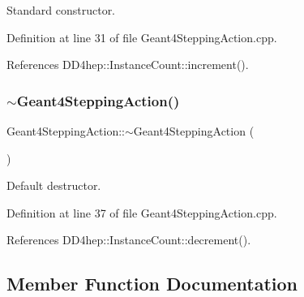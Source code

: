 Standard constructor. 



Definition at line 31 of file Geant4\+Stepping\+Action.\+cpp.



References D\+D4hep\+::\+Instance\+Count\+::increment().

\hypertarget{class_d_d4hep_1_1_simulation_1_1_geant4_stepping_action_a906c5651b3a3f39a44b4a3b5ab236375}{}\label{class_d_d4hep_1_1_simulation_1_1_geant4_stepping_action_a906c5651b3a3f39a44b4a3b5ab236375} 
\subsubsection{\texorpdfstring{$\sim$\+Geant4\+Stepping\+Action()}{~Geant4SteppingAction()}}
{\footnotesize\ttfamily Geant4\+Stepping\+Action\+::$\sim$\+Geant4\+Stepping\+Action (\begin{DoxyParamCaption}{ }\end{DoxyParamCaption})\hspace{0.3cm}{\ttfamily [virtual]}}



Default destructor. 



Definition at line 37 of file Geant4\+Stepping\+Action.\+cpp.



References D\+D4hep\+::\+Instance\+Count\+::decrement().



\subsection{Member Function Documentation}
\hypertarget{class_d_d4hep_1_1_simulation_1_1_geant4_stepping_action_ab6b61f6eaed6d06ddb3a7ed319258317}{}\label{class_d_d4hep_1_1_simulation_1_1_geant4_stepping_action_ab6b61f6eaed6d06ddb3a7ed319258317} 
